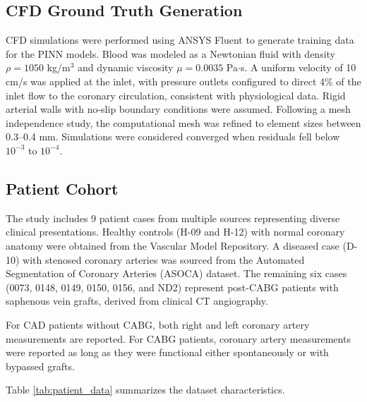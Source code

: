 \documentclass[12pt,a4paper]{article}
\begin{document}
\subsection{CFD Ground Truth Generation}

CFD simulations were performed using ANSYS Fluent to generate training data for the PINN models. Blood was modeled as a Newtonian fluid with density $\rho = 1050$ kg/m$^3$ and dynamic viscosity $\mu = 0.0035$ Pa$\cdot$s. A uniform velocity of 10 cm/s was applied at the inlet, with pressure outlets configured to direct 4\% of the inlet flow to the coronary circulation, consistent with physiological data. Rigid arterial walls with no-slip boundary conditions were assumed. Following a mesh independence study, the computational mesh was refined to element sizes between 0.3--0.4 mm. Simulations were considered converged when residuals fell below $10^{-3}$ to $10^{-4}$.

\subsection{Patient Cohort}

The study includes 9 patient cases from multiple sources representing diverse clinical presentations. Healthy controls (H-09 and H-12) with normal coronary anatomy were obtained from the Vascular Model Repository. A diseased case (D-10) with stenosed coronary arteries was sourced from the Automated Segmentation of Coronary Arteries (ASOCA) dataset. The remaining six cases (0073, 0148, 0149, 0150, 0156, and ND2) represent post-CABG patients with saphenous vein grafts, derived from clinical CT angiography.

For CAD patients without CABG, both right and left coronary artery measurements are reported. For CABG patients, coronary artery measurements were reported as long as they were functional either spontaneously or with bypassed grafts.

Table \ref{tab:patient_data} summarizes the dataset characteristics.
\end{document}
